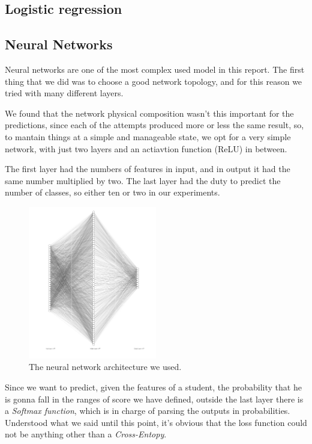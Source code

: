 \documentclass{article}
\begin{document}
\subsection{Logistic regression}
\subsection{Neural Networks}

Neural networks are one of the most complex used model in this report.
The first thing that we did was to choose a good network topology, and for this reason we tried with many different layers.

We found that the network physical composition wasn't this important for the predictions, since each of the attempts produced more or less the same 
result, so, to mantain things at a simple and manageable state, we opt for a very simple network, with just two layers and an actiavtion function 
(ReLU) in between.

The first layer had the numbers of features in input, and in output it had the same number multiplied by two. The last layer had the duty
to predict the number of classes, so either ten or two in our experiments.

\begin{figure}
    \centering
    \includegraphics[width=0.5\textwidth]{nn_architecture.png}
    \caption{\label{fig:nn}The neural network architecture we used.}
\end{figure}

Since we want to predict, given the features of a student, the probability that he is gonna fall in the ranges of score we have defined, outside the last layer there is a \emph{Softmax function}, which is in charge
of parsing the outputs in probabilities. 
Understood what we said until this point, it's obvious that the loss function could not be anything other than a \emph{Cross-Entopy}.
\end{document}
